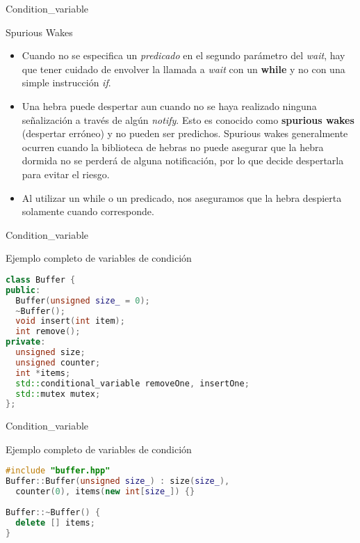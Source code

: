 \begin{frame}[fragile]{Condition\_variable}
\begin{block}{Spurious Wakes}
\begin{itemize}
  \item Cuando no se especifica un \textit{predicado} en el segundo parámetro del \textit{wait}, hay que tener cuidado de envolver la llamada a \textit{wait} con un \textbf{while} y no con una simple instrucción \textit{if}.
  \item Una hebra puede despertar aun cuando no se haya realizado ninguna señalización a través de algún \textit{notify}. Esto es conocido como \textbf{spurious wakes} (despertar erróneo) y no pueden ser predichos. Spurious wakes generalmente ocurren cuando la biblioteca de hebras no puede asegurar que la hebra dormida no se perderá de alguna notificación, por lo que decide despertarla para evitar el riesgo.
  \item Al utilizar un while o un predicado, nos aseguramos que la hebra despierta solamente cuando corresponde.
\end{itemize}
\end{block}
\end{frame}

\begin{frame}[fragile]{Condition\_variable}
\begin{block}{Ejemplo completo de variables de condición}
\begin{lstlisting}[language=C++, basicstyle=\small]
class Buffer {
public:
  Buffer(unsigned size_ = 0);
  ~Buffer();
  void insert(int item);
  int remove();
private:
  unsigned size;
  unsigned counter;
  int *items;
  std::conditional_variable removeOne, insertOne;
  std::mutex mutex;
};
\end{lstlisting}
\end{block}
\end{frame}

\begin{frame}[fragile]{Condition\_variable}
\begin{block}{Ejemplo completo de variables de condición}
\begin{lstlisting}[language=C++, basicstyle=\small]
#include "buffer.hpp"
Buffer::Buffer(unsigned size_) : size(size_),
  counter(0), items(new int[size_]) {}
  
Buffer::~Buffer() {
  delete [] items;
}
\end{lstlisting}
\end{block}
\end{frame}

